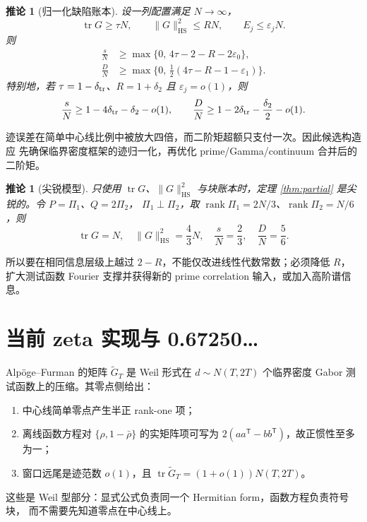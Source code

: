 \documentclass[UTF8,11pt,a4paper]{ctexart}
\newtheorem{corollary}[theorem]{推论}
\theoremstyle{definition}
\theoremstyle{remark}
\newcommand{\tr}{\operatorname{tr}}
\newcommand{\rank}{\operatorname{rank}}
\newcommand{\HS}{\mathrm{HS}}
\newcommand{\eps}{\varepsilon}
\begin{document}
\begin{corollary}[归一化缺陷账本]\label{cor:defect}
设一列配置满足 $N\to\infty$，
\[
 \tr G\ge\tau N,\qquad \|G\|_{\HS}^2\le RN,\qquad E_j\le\eps_jN.
\]
则
\begin{align}
 \frac{s}{N}&\ge\max\{0,\,4\tau-2-R-2\eps_0\}, \label{eq:norms}\\
 \frac{D}{N}&\ge\max\{0,\,\tfrac12(4\tau-R-1-\eps_1)\}. \label{eq:normd}
\end{align}
特别地，若 $\tau=1-\delta_{\rm tr}$、$R=1+\delta_2$ 且
$\eps_j=o(1)$，则
\[
 \frac{s}{N}\ge1-4\delta_{\rm tr}-\delta_2-o(1),\qquad
 \frac{D}{N}\ge1-2\delta_{\rm tr}-\frac{\delta_2}{2}-o(1).
\]
\end{corollary}

迹误差在简单中心线比例中被放大四倍，而二阶矩超额只支付一次。因此候选构造应
先确保临界密度框架的迹归一化，再优化 prime/Gamma/continuum 合并后的二阶矩。

\begin{corollary}[尖锐模型]\label{cor:sharp}
只使用 $\tr G$、$\|G\|_{\HS}^2$ 与块账本时，定理
\ref{thm:partial} 是尖锐的。令 $P=\Pi_1$、$Q=2\Pi_2$，
$\Pi_1\perp\Pi_2$，取 $\rank\Pi_1=2N/3$、$\rank\Pi_2=N/6$，则
\[
 \tr G=N,\quad \|G\|_{\HS}^2=\frac43N,\quad
 \frac{s}{N}=\frac23,\quad \frac{D}{N}=\frac56.
\]
\end{corollary}

所以要在相同信息层级上越过 $2-R$，不能仅改进线性代数常数；必须降低 $R$，
扩大测试函数 Fourier 支撑并获得新的 prime correlation 输入，或加入高阶谱信息。

\section{当前 zeta 实现与 0.67250\ldots}

Alpöge--Furman \cite{AF26} 的矩阵 $\widetilde G_T$ 是 Weil 形式在
$d\sim N(T,2T)$ 个临界密度 Gabor 测试函数上的压缩。其零点侧给出：
\begin{enumerate}[label=(Z\arabic*)]
\item 中心线简单零点产生半正 rank-one 项；
\item 离线函数方程对 $\{\rho,1-\bar\rho\}$ 的实矩阵项可写为
$2(aa^{\mathsf T}-bb^{\mathsf T})$，故正惯性至多为一；
\item 窗口远尾是迹范数 $o(1)$，且
$\tr\widetilde G_T=(1+o(1))N(T,2T)$。
\end{enumerate}
这些是 Weil 型部分：显式公式负责同一个 Hermitian form，函数方程负责符号块，
而不需要先知道零点在中心线上。
\end{document}

